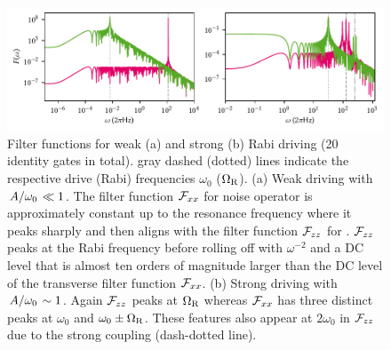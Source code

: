 \begin{figure}
    \centering
    \includegraphics{img/pdf/filter_functions/rabi_driving_weak_vs_strong}
    \caption[]{
        Filter functions for weak (a) and strong (b) Rabi driving (\num{20} identity gates in total).
        gray dashed (dotted) lines indicate the respective drive (Rabi) frequencies $\omega_0$ ($\Omega_{\mathrm{R}}$).
        (a) Weak driving with $\flatfrac{A}{\omega_\mr{0}}\ll 1$.
        The filter function $\mathcal{F}_{xx}$ for noise operator \sx is approximately constant up to the resonance frequency where it peaks sharply and then aligns with the filter function $\mathcal{F}_{zz}$ for \sz.
        $\mathcal{F}_{zz}$ peaks at the Rabi frequency before rolling off with $\omega^{-2}$ and a DC level that is almost ten orders of magnitude larger than the DC level of the transverse filter function $\mathcal{F}_{xx}$.
        (b) Strong driving with $\flatfrac{A}{\omega_\mr{0}}\sim 1$.
        Again $\mathcal{F}_{zz}$ peaks at $\Omega_{\mathrm{R}}$ whereas $\mathcal{F}_{xx}$ has three distinct peaks at $\omega_0$ and $\omega_0\pm\Omega_{\mathrm{R}}$.
        These features also appear at $2\omega_0$ in $\mathcal{F}_{zz}$ due to the strong coupling (dash-dotted line).
    }
    \label{fig:ff:filter_function:rabi:weak_vs_strong}
\end{figure}

